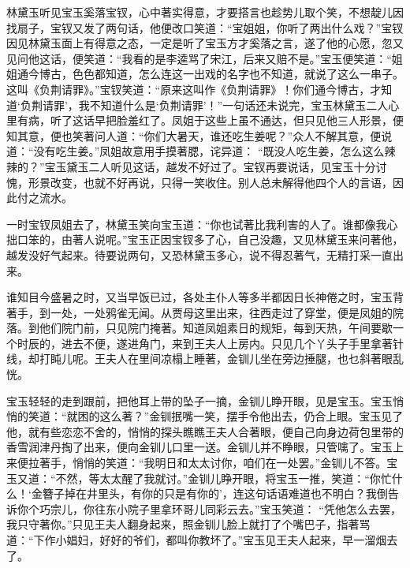 \begin{parag}
    林黛玉听见宝玉奚落宝钗，心中著实得意，才要搭言也趁势儿取个笑，不想靛儿因找扇子，宝钗又发了两句话，他便改口笑道：“宝姐姐，你听了两出什么戏？”宝钗因见林黛玉面上有得意之态，一定是听了宝玉方才奚落之言，遂了他的心愿，忽又见问他这话，便笑道：“我看的是李逵骂了宋江，后来又赔不是。”宝玉便笑道：“姐姐通今博古，色色都知道，怎么连这一出戏的名字也不知道，就说了这么一串子。这叫《负荆请罪》。”宝钗笑道：“原来这叫作《负荆请罪》！你们通今博古，才知道‘负荆请罪’，我不知道什么是‘负荆请罪’！”一句话还未说完，宝玉林黛玉二人心里有病，听了这话早把脸羞红了。凤姐于这些上虽不通达，但只见他三人形景，便知其意，便也笑著问人道：“你们大暑天，谁还吃生姜呢？”众人不解其意，便说道：“没有吃生姜。”凤姐故意用手摸著腮，诧异道： “既没人吃生姜，怎么这么辣辣的？”宝玉黛玉二人听见这话，越发不好过了。宝钗再要说话，见宝玉十分讨愧，形景改变，也就不好再说，只得一笑收住。别人总未解得他四个人的言语，因此付之流水。
\end{parag}


\begin{parag}
    一时宝钗凤姐去了，林黛玉笑向宝玉道：“你也试著比我利害的人了。谁都像我心拙口笨的，由著人说呢。”宝玉正因宝钗多了心，自己没趣，又见林黛玉来问著他，越发没好气起来。待要说两句，又恐林黛玉多心，说不得忍著气，无精打采一直出来。
\end{parag}


\begin{parag}
    谁知目今盛暑之时，又当早饭已过，各处主仆人等多半都因日长神倦之时，宝玉背著手，到一处，一处鸦雀无闻。从贾母这里出来，往西走过了穿堂，便是凤姐的院落。到他们院门前，只见院门掩著。知道凤姐素日的规矩，每到天热，午间要歇一个时辰的，进去不便，遂进角门，来到王夫人上房内。只见几个丫头子手里拿著针线，却打盹儿呢。王夫人在里间凉榻上睡著，金钏儿坐在旁边捶腿，也乜斜著眼乱恍。
\end{parag}


\begin{parag}
    宝玉轻轻的走到跟前，把他耳上带的坠子一摘，金钏儿睁开眼，见是宝玉。宝玉悄悄的笑道：“就困的这么著？”金钏抿嘴一笑，摆手令他出去，仍合上眼。宝玉见了他，就有些恋恋不舍的，悄悄的探头瞧瞧王夫人合著眼，便自己向身边荷包里带的香雪润津丹掏了出来，便向金钏儿口里一送。金钏儿并不睁眼，只管噙了。宝玉上来便拉著手，悄悄的笑道：“我明日和太太讨你，咱们在一处罢。”金钏儿不答。宝玉又道：“不然，等太太醒了我就讨。”金钏儿睁开眼，将宝玉一推，笑道：“你忙什么！‘金簪子掉在井里头，有你的只是有你的’，连这句话语难道也不明白？我倒告诉你个巧宗儿，你往东小院子里拿环哥儿同彩云去。”宝玉笑道： “凭他怎么去罢，我只守著你。”只见王夫人翻身起来，照金钏儿脸上就打了个嘴巴子，指著骂道：“下作小娼妇，好好的爷们，都叫你教坏了。”宝玉见王夫人起来，早一溜烟去了。
\end{parag}


